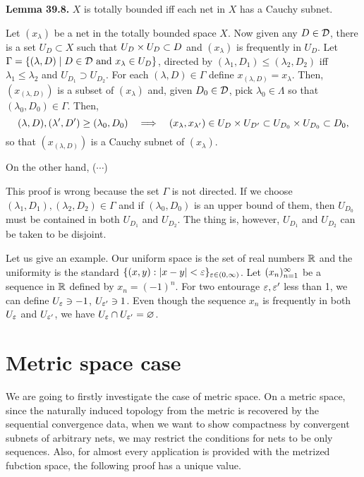 \documentclass{../exp}
\begin{document}
\noindent\textbf{Lemma 39.8.}
$X$ is totally bounded iff each net in $X$ has a Cauchy subnet.
\begin{pf}
Let $(x_\lambda)$ be a net in the totally bounded space $X$.
Now given any $D\in\mathcal{D}$, there is a set $U_D\subset X$ such that $U_D\times U_D\subset D$ and $(x_\lambda)$ is frequently in $U_D$.
Let $\Gamma=\{(\lambda,D)\mid D\in\mathcal{D}\text{ and }x_\lambda\in U_D\}$, directed by $(\lambda_1,D_1)\le(\lambda_2,D_2)$ iff $\lambda_1\le\lambda_2$ and $U_{D_1}\supset U_{D_2}$.
For each $(\lambda,D)\in\Gamma$ define $x_{(\lambda,D)}=x_\lambda$.
Then, $(x_{(\lambda,D)})$ is a subset of $(x_\lambda)$ and, given $D_0\in\mathcal{D}$, pick $\lambda_0\in\Lambda$ so that $(\lambda_0,D_0)\in\Gamma$.
Then,
\[(\lambda,D),(\lambda',D')\ge(\lambda_0,D_0)\impl(x_\lambda,x_{\lambda'})\in U_D\x U_{D'}\subset U_{D_0}\x U_{D_0}\subset D_0,\]
so that $(x_{(\lambda,D)})$ is a Cauchy subnet of $(x_\lambda)$.

On the other hand, ($\cdots$)
\end{pf}
\bigskip
This proof is wrong because the set $\Gamma$ is not directed.
If we choose $(\lambda_1,D_1),(\lambda_2,D_2)\in\Gamma$ and if $(\lambda_0,D_0)$ is an upper bound of them, then $U_{D_0}$ must be contained in both $U_{D_1}$ and $U_{D_2}$.
The thing is, however, $U_{D_1}$ and $U_{D_2}$ can be taken to be disjoint.

Let us give an example.
Our uniform space is the set of real numbers $\mathbb{R}$ and the uniformity is the standard $\{(x,y):|x-y|<\varepsilon\}_{\varepsilon\in(0,\infty)}$.
Let $(x_n)_{n=1}^\infty$ be a sequence in $\mathbb{R}$ defined by $x_n=(-1)^n$.
For two entourage $\varepsilon,\varepsilon'$ less than 1, we can define $U_\varepsilon\ni-1$, $U_{\varepsilon'}\ni1$.
Even though the sequence $x_n$ is frequently in both $U_\varepsilon$ and $U_{\varepsilon'}$, we have $U_\varepsilon\cap U_{\varepsilon'}=\varnothing$.





\section{Metric space case}

We are going to firstly investigate the case of metric space.
On a metric space, since the naturally induced topology from the metric is recovered by the sequential convergence data, when we want to show compactness by convergent subnets of arbitrary nets, we may restrict the conditions for nets to be only sequences.
Also, for almost every application is provided with the metrized fubction space, the following proof has a unique value.
\end{document}
